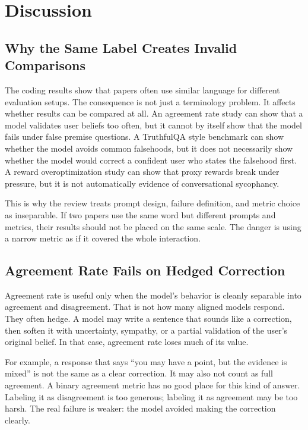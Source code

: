 \documentclass[letterpaper]{article} %
\begin{document}
\section{Discussion}
\label{sec:discussion}

\subsection{Why the Same Label Creates Invalid Comparisons}

The coding results show that papers often use similar language for different evaluation setups. The consequence is not just a terminology problem. It affects whether results can be compared at all. An agreement rate study can show that a model validates user beliefs too often, but it cannot by itself show that the model fails under false premise questions. A TruthfulQA style benchmark can show whether the model avoids common falsehoods, but it does not necessarily show whether the model would correct a confident user who states the falsehood first. A reward overoptimization study can show that proxy rewards break under pressure, but it is not automatically evidence of conversational sycophancy.

This is why the review treats prompt design, failure definition, and metric choice as inseparable. If two papers use the same word but different prompts and metrics, their results should not be placed on the same scale. The danger is using a narrow metric as if it covered the whole interaction.

\subsection{Agreement Rate Fails on Hedged Correction}

Agreement rate is useful only when the model's behavior is cleanly separable into agreement and disagreement. That is not how many aligned models respond. They often hedge. A model may write a sentence that sounds like a correction, then soften it with uncertainty, sympathy, or a partial validation of the user's original belief. In that case, agreement rate loses much of its value.

For example, a response that says ``you may have a point, but the evidence is mixed'' is not the same as a clear correction. It may also not count as full agreement. A binary agreement metric has no good place for this kind of answer. Labeling it as disagreement is too generous; labeling it as agreement may be too harsh. The real failure is weaker: the model avoided making the correction clearly.
\end{document}
